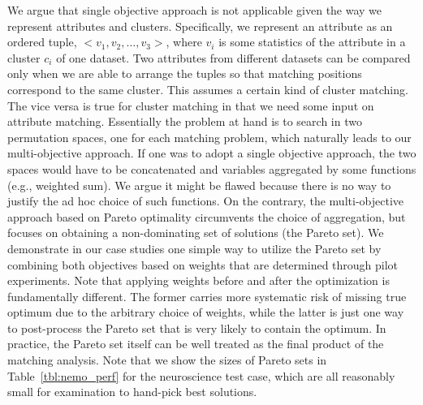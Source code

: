 We argue that single objective approach is not applicable given the way we represent attributes and clusters. Specifically, we represent an attribute as an ordered tuple, $<v_1, v_2, \ldots, v_3>$, where $v_i$ is some statistics of the attribute in a cluster $c_i$ of one dataset. Two attributes from different datasets can be compared only when we are able to arrange the tuples so that matching positions correspond to the same cluster. This assumes a certain kind of cluster matching. The vice versa is true for cluster matching in that we need some input on attribute matching. Essentially the problem at hand is to search in two permutation spaces, one for each matching problem, which naturally leads to our multi-objective approach. If one was to adopt a single objective approach, the two spaces would have to be concatenated and variables aggregated by some functions (e.g., weighted sum).  We argue it might be flawed because there is no way to justify the ad hoc choice of such functions. On the contrary, the multi-objective approach based on Pareto optimality circumvents the choice of aggregation, but focuses on obtaining a non-dominating set of solutions (the Pareto set). We demonstrate in our case studies one simple way to utilize the Pareto set by combining both objectives based on weights that are determined through pilot experiments. Note that applying weights before and after the optimization is fundamentally different. The former carries more systematic risk of missing true optimum due to the arbitrary choice of weights, while the latter is just one way to post-process the Pareto set that is very likely to contain the optimum. In practice, the Pareto set itself can be well treated as the final product of the matching analysis. Note that we show the sizes of Pareto sets in Table~\ref{tbl:nemo_perf} for the neuroscience test case, which are all reasonably small for examination to hand-pick best solutions.



